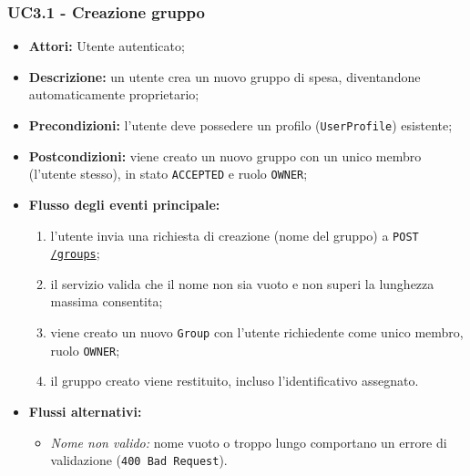 \subsubsection{UC3.1 - Creazione gruppo}
\begin{itemize}
    \item \textbf{Attori:} Utente autenticato;
    \item \textbf{Descrizione:} un utente crea un nuovo gruppo di spesa, diventandone automaticamente proprietario;
    \item \textbf{Precondizioni:} l'utente deve possedere un profilo (\texttt{UserProfile}) esistente;
    \item \textbf{Postcondizioni:} viene creato un nuovo gruppo con un unico membro (l'utente stesso), in stato \texttt{ACCEPTED} e ruolo \texttt{OWNER};
    \item \textbf{Flusso degli eventi principale:}
    \begin{enumerate}
        \item l'utente invia una richiesta di creazione (nome del gruppo) a \texttt{POST \url{/groups}};
        \item il servizio valida che il nome non sia vuoto e non superi la lunghezza massima consentita;
        \item viene creato un nuovo \texttt{Group} con l'utente richiedente come unico membro, ruolo \texttt{OWNER};
        \item il gruppo creato viene restituito, incluso l'identificativo assegnato.
    \end{enumerate}
    \item \textbf{Flussi alternativi:}
    \begin{itemize}
        \item \emph{Nome non valido:} nome vuoto o troppo lungo comportano un errore di validazione (\texttt{400 Bad Request}).
    \end{itemize}
\end{itemize}

